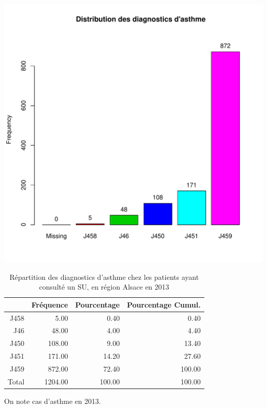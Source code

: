 \documentclass[12pt,english,french,twoside]{report}\usepackage[]{graphicx}\usepackage[]{color}
\makeatletter
\def\maxwidth{ %
  \ifdim\Gin@nat@width>\linewidth
    \linewidth
  \else
    \Gin@nat@width
  \fi
}
\makeatother
\begin{document}
\includegraphics[width=\maxwidth]{figure/asthme} 
\begin{table}[ht]
\centering
\begin{tabular}{rrrr}
  \hline
 & Fréquence & Pourcentage & Pourcentage Cumul. \\ 
  \hline
J458 & 5.00 & 0.40 & 0.40 \\ 
  J46 & 48.00 & 4.00 & 4.40 \\ 
  J450 & 108.00 & 9.00 & 13.40 \\ 
  J451 & 171.00 & 14.20 & 27.60 \\ 
  J459 & 872.00 & 72.40 & 100.00 \\ 
    Total & 1204.00 & 100.00 & 100.00 \\ 
   \hline
\end{tabular}
\caption[Répartition des diagnostics d'asthme]{Répartition des diagnostics d'asthme chez les patients ayant consulté un  SU, en région Alsace en 2013} 
\label{tab:asthme}
\end{table}



On note  cas d'asthme en 2013.
\end{document}
